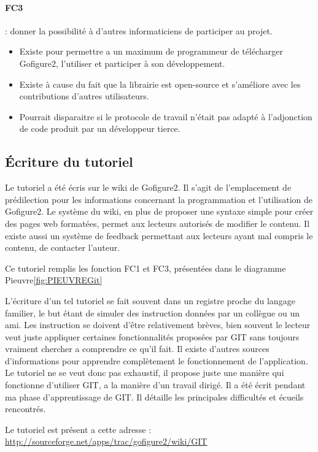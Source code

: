 \paragraph*{FC3} : donner la possibilité à d'autres informaticiens de participer au projet.
\begin{itemize}
  \item Existe pour permettre a un maximum de programmeur de télécharger Gofigure2, l'utiliser et participer à son développement.
  \item Existe à cause du fait que la librairie est open-source et s'améliore avec les contributions d'autres utilisateurs.
  \item Pourrait disparaitre si le protocole de travail n'était pas adapté à l'adjonction de code produit par un développeur tierce.
\end{itemize}


\subsection{Écriture du tutoriel}

Le tutoriel a été écris sur le wiki de Gofigure2. Il s'agit de l'emplacement de prédilection pour les informations 
concernant la programmation et l'utilisation de Gofigure2. Le système du wiki, en plus de proposer une syntaxe simple 
pour créer des pages web formatées, permet aux lecteurs autorisés de modifier le contenu. 
Il existe aussi un système de feedback permettant aux lecteurs ayant mal compris le contenu, de contacter l'auteur.

Ce tutoriel remplis les fonction FC1 et FC3, présentées dans le diagramme Pieuvre\ref{fig:PIEUVREGit}

L'écriture d'un tel tutoriel se fait souvent dans un registre proche du langage familier,
le but étant de simuler des instruction données par un collègue ou un ami. 
Les instruction se doivent d'être relativement brèves, bien souvent le lecteur veut juste appliquer certaines fonctionnalités 
proposées par GIT sans toujours vraiment chercher a comprendre ce qu'il fait. 
Il existe d'autres sources d'informations pour apprendre complètement le fonctionnement de l'application.
Le tutoriel ne se veut donc pas exhaustif, il propose juste une manière qui fonctionne d'utiliser GIT,
a la manière d'un travail dirigé. Il a été écrit pendant ma phase d'apprentissage de GIT. 
Il détaille les principales difficultés et écueils rencontrés. 

Le tutoriel est présent a cette adresse : \\
\url{http://sourceforge.net/apps/trac/gofigure2/wiki/GIT}

